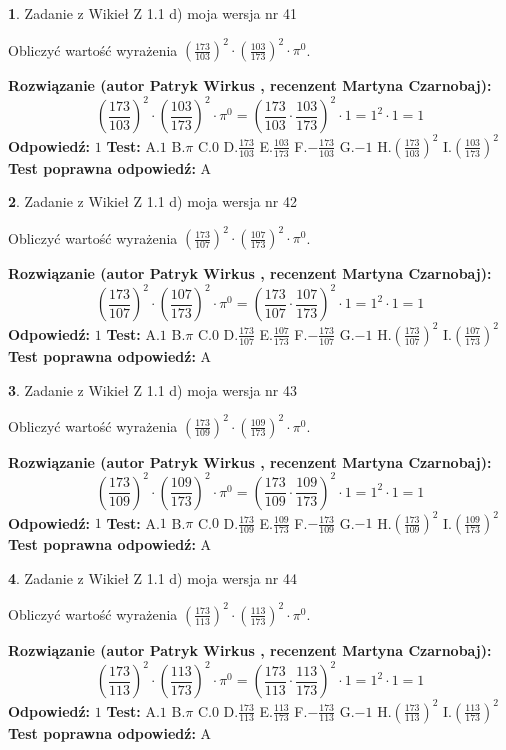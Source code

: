 \documentclass[12pt, a4paper]{article}
\theoremstyle{definition} %
\newtheorem{zad}{}
\newcommand{\zadStart}[1]{\begin{zad}#1\newline}
\newcommand{\zadStop}{\end{zad}}
\newcommand{\rozwStart}[2]{\noindent \textbf{Rozwiązanie (autor #1 , recenzent #2): }\newline}
\newcommand{\rozwStop}{\newline}
\newcommand{\odpStart}{\noindent \textbf{Odpowiedź:}\newline}
\newcommand{\odpStop}{\newline}
\newcommand{\testStart}{\noindent \textbf{Test:}\newline}
\newcommand{\testStop}{\newline}
\newcommand{\kluczStart}{\noindent \textbf{Test poprawna odpowiedź:}\newline}
\newcommand{\kluczStop}{\newline}
\begin{document}
\zadStart{Zadanie z Wikieł Z 1.1 d) moja wersja nr 41}

Obliczyć wartość wyrażenia $(\frac{173}{103})^{2} \cdot (\frac{103}{173})^{2} \cdot \pi^{0}$.
\zadStop
\rozwStart{Patryk Wirkus}{Martyna Czarnobaj}
$$(\frac{173}{103})^{2} \cdot (\frac{103}{173})^{2} \cdot \pi^{0} = (\frac{173}{103} \cdot \frac{103}{173})^{2} \cdot 1 = 1^{2} \cdot 1 = 1$$
\rozwStop
\odpStart
$1$
\odpStop
\testStart
A.$1$ B.$\pi$ C.$0$ D.$\frac{173}{103}$ E.$\frac{103}{173}$
F.$-\frac{173}{103}$ G.$-1$
H.$(\frac{173}{103})^{2}$
I.$(\frac{103}{173})^{2}$
\testStop
\kluczStart
A
\kluczStop



\zadStart{Zadanie z Wikieł Z 1.1 d) moja wersja nr 42}

Obliczyć wartość wyrażenia $(\frac{173}{107})^{2} \cdot (\frac{107}{173})^{2} \cdot \pi^{0}$.
\zadStop
\rozwStart{Patryk Wirkus}{Martyna Czarnobaj}
$$(\frac{173}{107})^{2} \cdot (\frac{107}{173})^{2} \cdot \pi^{0} = (\frac{173}{107} \cdot \frac{107}{173})^{2} \cdot 1 = 1^{2} \cdot 1 = 1$$
\rozwStop
\odpStart
$1$
\odpStop
\testStart
A.$1$ B.$\pi$ C.$0$ D.$\frac{173}{107}$ E.$\frac{107}{173}$
F.$-\frac{173}{107}$ G.$-1$
H.$(\frac{173}{107})^{2}$
I.$(\frac{107}{173})^{2}$
\testStop
\kluczStart
A
\kluczStop



\zadStart{Zadanie z Wikieł Z 1.1 d) moja wersja nr 43}

Obliczyć wartość wyrażenia $(\frac{173}{109})^{2} \cdot (\frac{109}{173})^{2} \cdot \pi^{0}$.
\zadStop
\rozwStart{Patryk Wirkus}{Martyna Czarnobaj}
$$(\frac{173}{109})^{2} \cdot (\frac{109}{173})^{2} \cdot \pi^{0} = (\frac{173}{109} \cdot \frac{109}{173})^{2} \cdot 1 = 1^{2} \cdot 1 = 1$$
\rozwStop
\odpStart
$1$
\odpStop
\testStart
A.$1$ B.$\pi$ C.$0$ D.$\frac{173}{109}$ E.$\frac{109}{173}$
F.$-\frac{173}{109}$ G.$-1$
H.$(\frac{173}{109})^{2}$
I.$(\frac{109}{173})^{2}$
\testStop
\kluczStart
A
\kluczStop



\zadStart{Zadanie z Wikieł Z 1.1 d) moja wersja nr 44}

Obliczyć wartość wyrażenia $(\frac{173}{113})^{2} \cdot (\frac{113}{173})^{2} \cdot \pi^{0}$.
\zadStop
\rozwStart{Patryk Wirkus}{Martyna Czarnobaj}
$$(\frac{173}{113})^{2} \cdot (\frac{113}{173})^{2} \cdot \pi^{0} = (\frac{173}{113} \cdot \frac{113}{173})^{2} \cdot 1 = 1^{2} \cdot 1 = 1$$
\rozwStop
\odpStart
$1$
\odpStop
\testStart
A.$1$ B.$\pi$ C.$0$ D.$\frac{173}{113}$ E.$\frac{113}{173}$
F.$-\frac{173}{113}$ G.$-1$
H.$(\frac{173}{113})^{2}$
I.$(\frac{113}{173})^{2}$
\testStop
\kluczStart
A
\kluczStop
\end{document}
